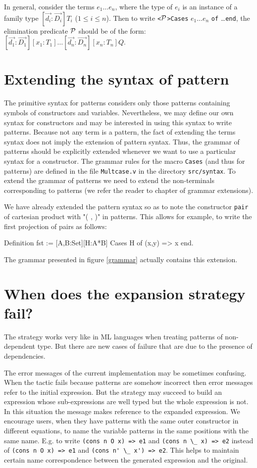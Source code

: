 In general, consider the terms $e_1\ldots e_n$,
where  the type of $e_i$ is an instance of a family type
$[\vec{d_i}:\vec{D_i}]T_i$  ($1\leq i
\leq n$). Then to  write \verb+<+${\cal P}$\verb+>Cases+  $e_1\ldots
e_n$ \verb+of+ \ldots \verb+end+, the 
elimination predicate ${\cal P}$ should be of the form:
$[\vec{d_1}:\vec{D_1}][x_1:T_1]\ldots [\vec{d_n}:\vec{D_n}][x_n:T_n]Q.$




\section{Extending the syntax of pattern}
The primitive syntax for patterns considers only those patterns containing
symbols of constructors and variables. Nevertheless, we
may define our own syntax for  constructors and may be interested in
using this syntax to write patterns. 
Because not  any term is a pattern, the fact of extending the terms
syntax does not imply the extension of pattern syntax. Thus,  
the grammar of patterns should be explicitly extended whenever we
want to use a particular syntax for a constructor.
The grammar rules for the macro  \verb+Cases+ (and thus for patterns)
are defined in the file \verb+Multcase.v+ in the directory
\verb+src/syntax+. To extend the grammar of patterns 
we need to extend the non-terminals corresponding to patterns
(we refer the reader to chapter of grammar extensions).

 
We have already extended the pattern syntax so as to note
the constructor \verb+pair+ of cartesian product  with "( , )" in patterns. 
This allows for example, to write the first projection
of pairs as follows:
\begin{coq_example}
Definition fst := [A,B:Set][H:A*B] Cases H of (x,y) => x end.
\end{coq_example}
The grammar presented in figure \ref{grammar} actually
contains this extension. 

\section{When does the expansion strategy fail?}\label{limitations}
The strategy works very like in ML languages when treating
patterns of non-dependent type.  
But there are new cases of failure that are due to the presence of 
dependencies. 

The error messages of the current implementation may be
sometimes confusing.
When the tactic fails because patterns are somehow incorrect  then 
error messages refer to the initial expression. But the strategy
may succeed to build an expression whose sub-expressions are well typed but
the whole expression is not. In this situation  the message makes 
reference to the expanded expression.
We encourage users, when they have patterns with the same outer constructor in different equations, to name the variable patterns in the same positions with the same name.
E.g. to write {\small\verb+(cons n O x) => e1+} and  {\small\verb+(cons n \_ x) => e2+} instead of
{\small\verb+(cons n O x) => e1+} and  {\small\verb+(cons n' \_ x') => e2+}. This helps to maintain certain name correspondence  between the generated expression and the original.


